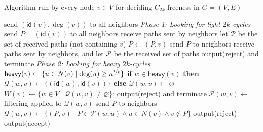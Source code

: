 \documentclass{article}
\newcommand{\lebontau}{6\cdot (2k)^\ell}
\newcommand{\id}{\mathsf{id}}
\begin{document}
\begin{algorithm}[p]
\caption{Algorithm run by every node $v\in V$ for deciding $C_{2k}$-freeness in $G=(V,E)$}\label{alg_C2k}
\begin{algorithmic}[1]
    \State \textsf{send} $(\id(v),\deg(v))$ to all neighbors \label{ins:basic-first-step}
    \State \textit{Phase 1: Looking for light $2k$-cycles}
    \label{ins:light_begin}
        \State \textsf{send} $P=(\id(v))$ to all neighbors \label{ins:light_BFS_init}
            \State \textsf{receive} paths sent by neighbors
            \State let $\mathcal{P}$ be the set of received paths (not containing $v$)\label{ins:apply-filtering-light}
                \State $P\gets (P,v)$ \label{ins:light_BFS}
                \State \textsf{send} $P$ to neighbors
            \EndFor
        \EndFor
        \State  \textsf{receive} paths sent by neighbors, and let $\mathcal{P}$ be the received set of paths
            \State \textsf{output}(reject) and terminate
        \EndIf 
    \EndIf\label{ins:light_end}
    \State \textit{Phase 2: Looking for heavy $2k$-cycles} \label{ins:start-heavy-here}
    \State $\mathsf{heavy}(v)\gets \{u\in N(v) \mid \deg(u)\geq n^{\nicefrac{1}{k}}\}$
        \State \textbf{if} $w\in \mathsf{heavy}(v)$ \textbf{then} $\mathcal{Q}(w,v)\gets \{(\id(w),\id(v))\}$ \textbf{else} $\mathcal{Q}(w,v)\gets \varnothing$ \label{ins:heavy_init}
    \EndFor
        \label{the-for-loop-for-heavy-C2k}
            \State $W(v)\gets\{w\in V\mid \mathcal{Q}(w,v)\neq\varnothing\}$; \label{ins:set_W}
            \If{$|W(v)|> \lebontau \cdot n^{1-\nicefrac{1}{k}}$}\label{ins:heavy_thres}
                \State \textsf{output}(reject)  and terminate
            \Else
                    \State $\mathcal{P}(w,v)\gets$ filtering applied to $\mathcal{Q}(w,v)$ \label{ins:set_P}
                        \State send $P$ to neighbors \label{ins:heavy_broadcast}
                    \EndFor
                \EndFor
                    \State $\mathcal{Q}(w,v)\gets \{(P,v)\mid P\in \mathcal{P}(w,u) \land u\in N(v) \land v\notin P\}$ \label{ins:set_Q}
                \EndFor
            \EndIf
        \EndFor
        \label{ins:heavy_detect}
            \State \textsf{output}(reject)
        \Else
            \State \textsf{output}(accept)
        \EndIf\label{ins:heavy_end}
    \end{algorithmic}
\end{algorithm}
\end{document}
